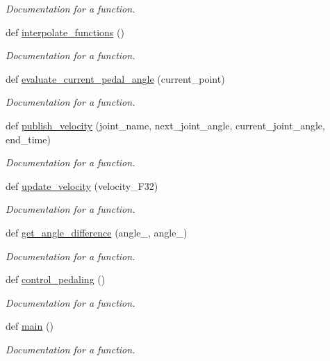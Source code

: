 \begin{DoxyCompactItemize}
\begin{DoxyCompactList}\small\item\em Documentation for a function. \end{DoxyCompactList}\item 
def \mbox{\hyperlink{namespacepedal__simulation__interpolation__lennard_ae9c9788cdc89b6581cd2a587ef85282c}{interpolate\+\_\+functions}} ()
\begin{DoxyCompactList}\small\item\em Documentation for a function. \end{DoxyCompactList}\item 
def \mbox{\hyperlink{namespacepedal__simulation__interpolation__lennard_ab435b1b0cf2f13e1e33b8870ac13e415}{evaluate\+\_\+current\+\_\+pedal\+\_\+angle}} (current\+\_\+point)
\begin{DoxyCompactList}\small\item\em Documentation for a function. \end{DoxyCompactList}\item 
def \mbox{\hyperlink{namespacepedal__simulation__interpolation__lennard_a2c1393a71ebf4ef7da408eb959e9a8ad}{publish\+\_\+velocity}} (joint\+\_\+name, next\+\_\+joint\+\_\+angle, current\+\_\+joint\+\_\+angle, end\+\_\+time)
\begin{DoxyCompactList}\small\item\em Documentation for a function. \end{DoxyCompactList}\item 
def \mbox{\hyperlink{namespacepedal__simulation__interpolation__lennard_a815caeaf6a6a52507b939cbaad0e676b}{update\+\_\+velocity}} (velocity\+\_\+\+F32)
\begin{DoxyCompactList}\small\item\em Documentation for a function. \end{DoxyCompactList}\item 
def \mbox{\hyperlink{namespacepedal__simulation__interpolation__lennard_ae98aebfd88ca1ccae8edacb3b860c21a}{get\+\_\+angle\+\_\+difference}} (angle\+\_, angle\+\_)
\begin{DoxyCompactList}\small\item\em Documentation for a function. \end{DoxyCompactList}\item 
def \mbox{\hyperlink{namespacepedal__simulation__interpolation__lennard_a5dd1a3cc2835a811ad8851e5f235d1c0}{control\+\_\+pedaling}} ()
\begin{DoxyCompactList}\small\item\em Documentation for a function. \end{DoxyCompactList}\item 
def \mbox{\hyperlink{namespacepedal__simulation__interpolation__lennard_a29ca8543b538f5084be3465159234d94}{main}} ()
\begin{DoxyCompactList}\small\item\em Documentation for a function. \end{DoxyCompactList}\end{DoxyCompactItemize}
